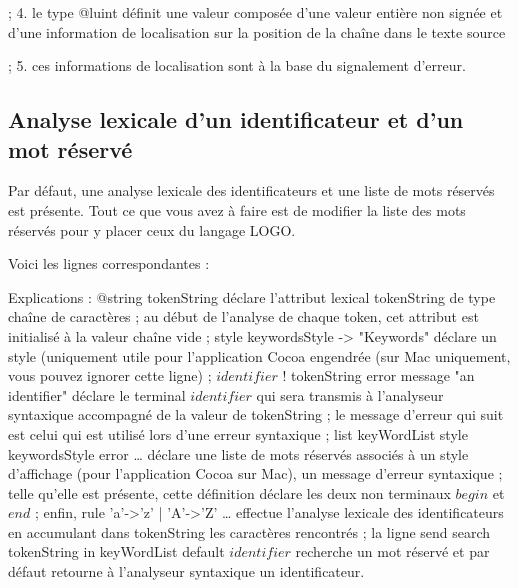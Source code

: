 ;
4.	le type @luint définit une valeur composée d'une valeur entière non signée et d'une information de localisation sur la position de la chaîne dans le texte source 

;
5.	ces informations de localisation sont à la base du signalement d'erreur.

\subsection{Analyse lexicale d'un identificateur et d'un mot réservé}

Par défaut, une analyse lexicale des identificateurs et une liste de mots réservés est présente. Tout ce que vous avez à faire est de modifier la liste des mots réservés pour y placer ceux du langage LOGO.

Voici les lignes correspondantes :


Explications :
@string tokenString déclare l’attribut lexical tokenString de type chaîne de caractères ; au début de l’analyse de chaque token, cet attribut est initialisé à la valeur chaîne vide ;
style keywordsStyle -> "Keywords" déclare un style (uniquement utile pour l’application Cocoa engendrée (sur Mac uniquement, vous pouvez ignorer cette ligne) ;
$identifier$ ! tokenString error message "an identifier" déclare le terminal $identifier$ qui sera transmis à l’analyseur syntaxique accompagné de la valeur de tokenString ;  le message d’erreur qui suit est celui qui est utilisé lors d’une erreur syntaxique ;
list keyWordList style keywordsStyle error … déclare une liste de mots réservés associés à un style d’affichage (pour l’application Cocoa sur Mac), un message d’erreur syntaxique ; telle qu’elle est présente, cette définition déclare les deux non terminaux $begin$ et $end$ ;
enfin, rule 'a'->'z' | 'A'->'Z' … effectue l’analyse lexicale des identificateurs en accumulant dans tokenString les caractères rencontrés ; la ligne send search tokenString in keyWordList default $identifier$ recherche un mot réservé et par défaut retourne à l’analyseur syntaxique un identificateur.

